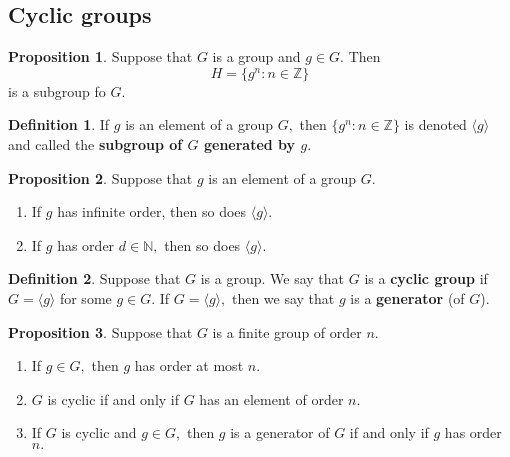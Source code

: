 \documentclass[12pt, a4paper]{article}
\newcommand{\bb}[1]{\mathbb{#1}}
\theoremstyle{definition}
\newtheorem{definition}{Definition}[section]
\newtheorem{proposition}{Proposition}
\theoremstyle{plain}
\begin{document}
\subsection{Cyclic groups}

\begin{proposition}
Suppose that $G$ is a group and $g \in G.$ Then 
$$H=\{g^n : n\in \bb{Z}\}$$
is a subgroup fo $G.$
\end{proposition}

\begin{definition}
If $g$ is an element of a group $G,$ then $\{g^n :n \in \bb{Z}\}$ is denoted $\langle g \rangle$ and called the \textbf{subgroup of $G$ generated by $g.$}
\end{definition}

\begin{proposition}
Suppose that $g$ is an element of a group $G.$
\begin{enumerate}
	
	\item If $g$ has infinite order, then so does $\langle g \rangle.$

	\item If $g$ has order $d\in \bb{N},$ then so does $\langle g \rangle.$

\end{enumerate}
\end{proposition}

\begin{definition}
Suppose that $G$ is a group. We say that $G$ is a \textbf{cyclic group} if $G=\langle g \rangle$ for some $g\in G.$ If $G=\langle g \rangle,$ then we say that $g$ is a \textbf{generator} (of $G$).
\end{definition}

\begin{proposition}
Suppose that $G$ is a finite group of order $n.$
\begin{enumerate}
	
	\item If $g\in G,$ then $g$ has order at most $n.$

	\item $G$ is cyclic if and only if $G$ has an element of order $n.$

	\item If $G$ is cyclic and $g \in G,$ then $g$ is a generator of $G$ if and only if $g$ has order $n.$

\end{enumerate}
\end{proposition}
\end{document}
